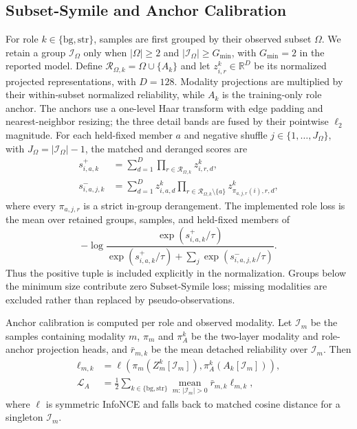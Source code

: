 \subsection{Subset-Symile and Anchor Calibration}
For role $k\in\{\mathrm{bg},\mathrm{str}\}$, samples are first grouped by their observed subset $\Omega$. We retain a group $\mathcal I_\Omega$ only when $|\Omega|\ge2$ and $|\mathcal I_\Omega|\ge G_{\min}$, with $G_{\min}=2$ in the reported model. Define $\mathcal R_{\Omega,k}=\Omega\cup\{A_k\}$ and let $z^k_{i,r}\in\mathbb R^D$ be its normalized projected representations, with $D=128$. Modality projections are multiplied by their within-subset normalized reliability, while $A_k$ is the training-only role anchor. The anchors use a one-level Haar transform with edge padding and nearest-neighbor resizing; the three detail bands are fused by their pointwise $\ell_2$ magnitude. For each held-fixed member $a$ and negative shuffle $j\in\{1,\ldots,J_\Omega\}$, with $J_\Omega=|\mathcal I_\Omega|-1$, the matched and deranged scores are
\begin{align}
s^+_{i,a,k}
&=\sum_{d=1}^{D}\prod_{r\in\mathcal R_{\Omega,k}} z^k_{i,r,d},\\
s^-_{i,a,j,k}
&=\sum_{d=1}^{D}z^k_{i,a,d}
\prod_{r\in\mathcal R_{\Omega,k}\setminus\{a\}}
z^k_{\pi_{a,j,r}(i),r,d},
\end{align}
where every $\pi_{a,j,r}$ is a strict in-group derangement. The implemented role loss is the mean over retained groups, samples, and held-fixed members of
\begin{equation}
-\log
\frac{\exp(s^+_{i,a,k}/\tau)}
{\exp(s^+_{i,a,k}/\tau)+\sum_j\exp(s^-_{i,a,j,k}/\tau)}.
\label{eq:subset-symile-detail}
\end{equation}
Thus the positive tuple is included explicitly in the normalization. Groups below the minimum size contribute zero Subset-Symile loss; missing modalities are excluded rather than replaced by pseudo-observations.

Anchor calibration is computed per role and observed modality. Let $\mathcal I_m$ be the samples containing modality $m$, $\pi_m$ and $\pi_A^k$ be the two-layer modality and role-anchor projection heads, and $\bar r_{m,k}$ be the mean detached reliability over $\mathcal I_m$. Then
\begin{align}
\ell_{m,k}
&=\ell\!\left(\pi_m(Z_m^k[\mathcal I_m]),
\pi_A^k(A_k[\mathcal I_m])\right),\\
\mathcal L_A
&=\frac{1}{2}\sum_{k\in\{\mathrm{bg},\mathrm{str}\}}
\operatorname*{mean}_{m:\,|\mathcal I_m|>0}
\bar r_{m,k}\ell_{m,k},
\end{align}
where $\ell$ is symmetric InfoNCE and falls back to matched cosine distance for a singleton $\mathcal I_m$.

